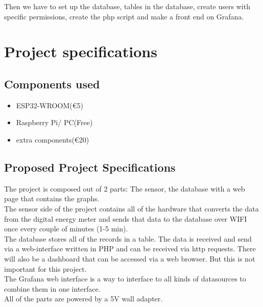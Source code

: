 \documentclass[a4paper,twoside, 12pt]{report}
\theoremstyle{break}
\begin{document}
Then we have to set up the database, tables in the database, create users with specific permissions, create the php script and make a front end on Grafana.

\chapter{Project specifications}
\section{Components used}
\begin{itemize}
  \item ESP32-WROOM\tabto{11cm}(€5)
  \item Raspberry Pi/ PC\tabto{11cm}(Free)
  \item extra components\tabto{11cm}(€20)

\end{itemize}

\section{Proposed Project Specifications}
The project is composed out of 2 parts: The sensor, the database with a web page that contains the graphs. \ \\
The sensor side of the project contains all of the hardware that converts the data from the digital energy meter and sends that data to the database over WIFI once every couple of minutes (1-5 min).
\ \\
The database stores all of the records in a table. The data is received and send via a web-interface written in PHP and can be received via http requests. There will also be a dashboard that can be accessed via a web browser. But this is not important for this project.
\ \\
The Grafana web interface is a way to interface to all kinds of datasources to combine them in one interface.
\ \\
All of the parts are powered by a 5V wall adapter.

\begin{landscape}
  
\end{landscape}

\begin{landscape}
  
\end{landscape}
\end{document}
